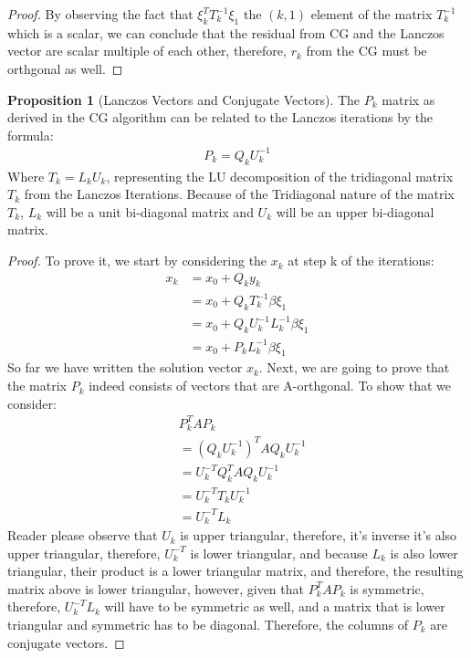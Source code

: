 \documentclass[]{article}
\theoremstyle{definition}
\newtheorem{prop}{Proposition}[section]  %
\begin{document}
\begin{proof}
                By observing the fact that $\xi^T_kT^{-1}_k\xi_1$ the $(k, 1)$ element of the matrix $T_k^{-1}$ which is a scalar, we can conclude that the residual from CG and the Lanczos vector are scalar multiple of each other, therefore, $r_k$ from the CG must be orthgonal as well. 
            \end{proof}
            \begin{prop}[Lanczos Vectors and Conjugate Vectors]
                The $P_k$ matrix as derived in the CG algorithm can be related to the Lanczos iterations by the formula: 
                \begin{align}
                    P_k = Q_k U_k^{-1}
                \end{align}
                Where $T_k = L_kU_k$, representing the LU decomposition of the tridiagonal matrix $T_k$ from the Lanczos Iterations. Because of the Tridiagonal nature of the matrix $T_k$, $L_k$ will be a unit bi-diagonal matrix and $U_k$ will be an upper bi-diagonal matrix. 
            \end{prop}
            \begin{proof}
                To prove it, we start by considering the $x_k$ at step k of the iterations: 
                \begin{align}
                    x_k &= x_0 + Q_k y_k 
                    \\
                    &= x_0 + Q_k T_{k}^{-1} \beta \xi_1
                    \\
                    &= x_0 + Q_k U_k^{-1}L_k^{-1}\beta \xi_1
                    \\
                    &= x_0 + P_k L_k^{-1}\beta\xi_1
                \end{align}
                So far we have written the solution vector $x_k$. Next, we are going to prove that the matrix $P_k$ indeed consists of vectors that are A-orthgonal. To show that we consider: 
                \begin{align}
                    & P_k^TAP_k
                    \\
                    &= (Q_k U_k^{-1})^T AQ_kU_k^{-1}
                    \\
                    &= U_k^{-T}Q_k^{T}AQ_k U_k^{-1}
                    \\
                    &= U_k^{-T}T_kU_k^{-1}
                    \\
                    &= U^{-T}_kL_k
                \end{align}
                Reader please observe that $U_k$ is upper triangular, therefore, it's inverse it's also upper triangular, therefore, $U_k^{-T}$ is lower triangular, and because $L_k$ is also lower triangular, their product is a lower triangular matrix, and therefore, the resulting matrix above is lower triangular, however, given that $P_k^TAP_k$ is symmetric, therefore, $U_k^{-T}L_k$ will have to be symmetric as well, and a matrix that is lower triangular and symmetric has to be diagonal. Therefore, the columns of $P_k$ are conjugate vectors. 
            \end{proof}
\end{document}

